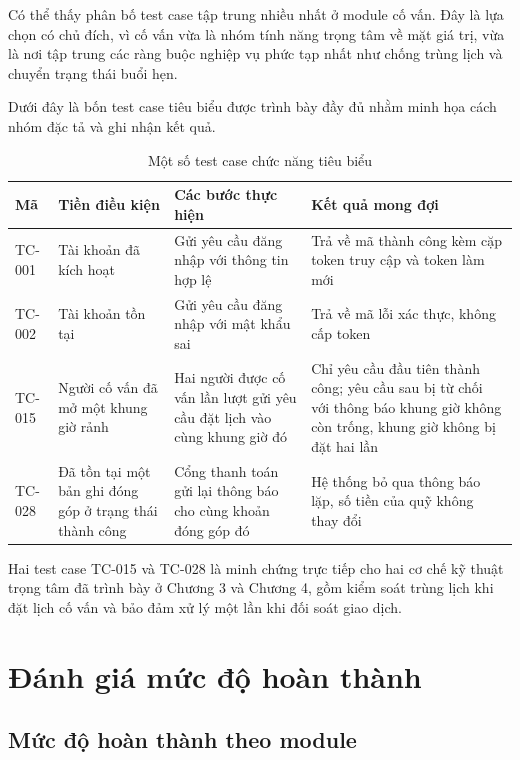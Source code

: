 \documentclass[12pt,a4paper,oneside]{report}
\begin{document}
Có thể thấy phân bố test case tập trung nhiều nhất ở module cố vấn. Đây là lựa chọn có chủ đích, vì cố vấn vừa là nhóm tính năng trọng tâm về mặt giá trị, vừa là nơi tập trung các ràng buộc nghiệp vụ phức tạp nhất như chống trùng lịch và chuyển trạng thái buổi hẹn.

Dưới đây là bốn test case tiêu biểu được trình bày đầy đủ nhằm minh họa cách nhóm đặc tả và ghi nhận kết quả.

\renewcommand{\arraystretch}{1.25}
\begin{table}[H]
\centering
\small
\caption{Một số test case chức năng tiêu biểu}
\label{tab:sampletc}
\begin{tabular}{|>{\raggedright\arraybackslash}p{1.5cm}|>{\raggedright\arraybackslash}p{3.4cm}|>{\raggedright\arraybackslash}p{4.4cm}|>{\raggedright\arraybackslash}p{4.2cm}|}
\hline
\textbf{Mã} & \textbf{Tiền điều kiện} & \textbf{Các bước thực hiện} & \textbf{Kết quả mong đợi} \\ \hline
TC-001 & Tài khoản đã kích hoạt & Gửi yêu cầu đăng nhập với thông tin hợp lệ & Trả về mã thành công kèm cặp token truy cập và token làm mới \\ \hline
TC-002 & Tài khoản tồn tại & Gửi yêu cầu đăng nhập với mật khẩu sai & Trả về mã lỗi xác thực, không cấp token \\ \hline
TC-015 & Người cố vấn đã mở một khung giờ rảnh & Hai người được cố vấn lần lượt gửi yêu cầu đặt lịch vào cùng khung giờ đó & Chỉ yêu cầu đầu tiên thành công; yêu cầu sau bị từ chối với thông báo khung giờ không còn trống, khung giờ không bị đặt hai lần \\ \hline
TC-028 & Đã tồn tại một bản ghi đóng góp ở trạng thái thành công & Cổng thanh toán gửi lại thông báo cho cùng khoản đóng góp đó & Hệ thống bỏ qua thông báo lặp, số tiền của quỹ không thay đổi \\ \hline
\end{tabular}
\end{table}
\renewcommand{\arraystretch}{1}

Hai test case TC-015 và TC-028 là minh chứng trực tiếp cho hai cơ chế kỹ thuật trọng tâm đã trình bày ở Chương 3 và Chương 4, gồm kiểm soát trùng lịch khi đặt lịch cố vấn và bảo đảm xử lý một lần khi đối soát giao dịch.

\section{Đánh giá mức độ hoàn thành}

\subsection{Mức độ hoàn thành theo module}
\end{document}
